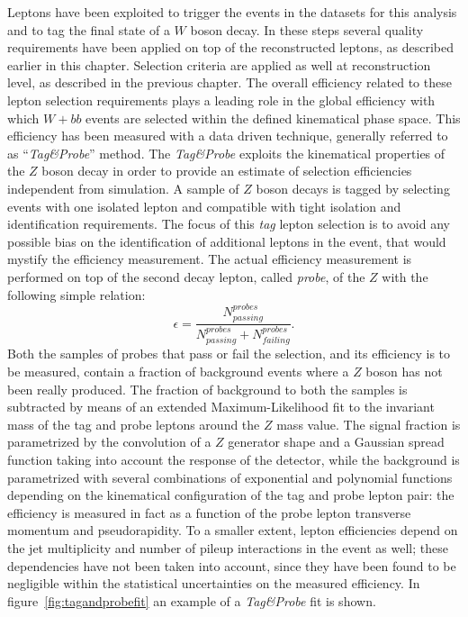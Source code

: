 Leptons have been exploited to trigger the events in the datasets 
for this analysis 
and to tag the final state of a $W$ boson decay. 
In these steps several quality requirements have been applied on 
top of the reconstructed leptons, 
as described earlier in this chapter. 
Selection criteria are applied as well at reconstruction level, 
as described in the previous chapter.
The overall efficiency related to these lepton selection requirements plays a 
leading role in the global efficiency with which $W + bb$ events are
selected within the defined kinematical phase space.
This efficiency has been measured with a data driven technique, 
generally referred to as ``\textit{Tag\&Probe}'' method.
The \textit{Tag\&Probe} exploits the kinematical properties of the 
$Z$ boson decay in order to provide an estimate of selection efficiencies 
independent from simulation. A sample of $Z$ boson decays is tagged by selecting
events with one isolated lepton and compatible with tight isolation and 
identification requirements. The focus of this \textit{tag} lepton selection 
is to avoid any possible bias on the identification of additional 
leptons in the event, that would mystify the efficiency measurement.
The actual efficiency measurement is performed on top of the second decay lepton,
called \textit{probe}, 
of the $Z$ with the following simple relation:
$$ \epsilon = \frac{ N_{passing}^{probes}}{N_{passing}^{probes} + N_{failing}^{probes} } \mathrm{.}$$
Both the samples of probes that pass or fail the selection, and its efficiency 
is to be measured, contain a fraction of background events where a $Z$ boson has not 
been really produced. The fraction of background to both the samples is subtracted 
by means of an extended Maximum-Likelihood fit to the invariant mass 
of the tag and probe leptons around the $Z$ mass value. 
The signal fraction is parametrized by the convolution of 
a $Z$ generator shape and a Gaussian spread function taking into account 
the response of the detector, while the background is parametrized with several combinations 
of exponential and polynomial functions depending on the kinematical configuration of the 
tag and probe lepton pair: the efficiency is measured in fact  as a function of the 
probe lepton transverse momentum and pseudorapidity. To a smaller extent, 
lepton efficiencies depend on the jet multiplicity and number of pileup interactions 
in the event as well; these dependencies have not been taken into account, since they  
have been found to be negligible within the 
statistical uncertainties on the measured efficiency.
In figure~\ref{fig:tagandprobefit} an example of a \textit{Tag\&Probe} fit 
is shown.

